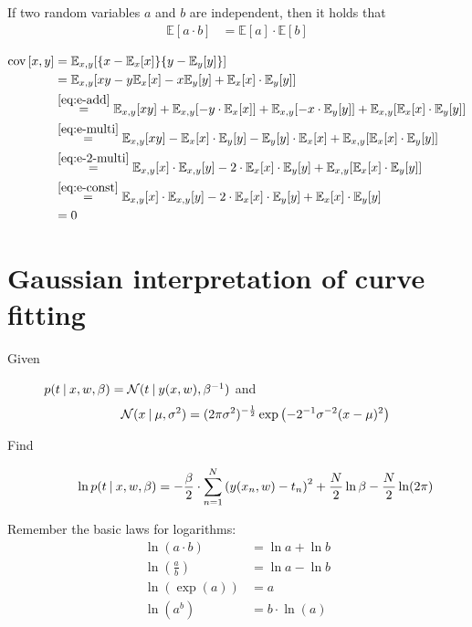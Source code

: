 \documentclass[a4paper]{article}
\newcommand\E{\mathbb{E}}
\newcommand\N{\mathcal{N}}
\DeclareMathOperator\cov{cov}
\newcommand\given{
  \nonscript\:
  \vert
  \nonscript\:
  \mathopen{}
  \allowbreak
}
\begin{document}
If two random variables $a$ and $b$ are independent, then it holds that
\begin{align}
  \E[a \cdot b] &= \E[a] \cdot \E[b]       \label{eq:e-2-multi}
\end{align}

\begin{align*}
  \cov{[x,y]}
    &= \E_{x,y}[\{x - \E_{x}[x]\}\{y - \E_{y}[y]\}] \\
    &= \E_{x,y}[xy - y\E_x[x] - x\E_y[y] + \E_x[x] \cdot \E_y[y]] \\
    &\overset{\eqref{eq:e-add}}{=} \E_{x,y}[xy] + \E_{x,y}[-y \cdot \E_x[x]] + \E_{x,y}[-x \cdot \E_y[y]] + \E_{x,y}[\E_x[x] \cdot \E_y[y]] \\
    &\overset{\eqref{eq:e-multi}}{=} \E_{x,y}[xy] - \E_x[x] \cdot \E_{y}[y] - \E_{y}[y] \cdot \E_{x}[x] + \E_{x,y}[\E_x[x] \cdot \E_y[y]] \\
    &\overset{\eqref{eq:e-2-multi}}{=} \E_{x,y}[x] \cdot \E_{x,y}[y] - 2 \cdot \E_x[x] \cdot \E_{y}[y] + \E_{x,y}[\E_x[x] \cdot \E_y[y]] \\
    &\overset{\eqref{eq:e-const}}{=} \E_{x,y}[x] \cdot \E_{x,y}[y] - 2 \cdot \E_x[x] \cdot \E_{y}[y] + \E_x[x] \cdot \E_y[y] \\
    &= 0
\end{align*}

\section{Gaussian interpretation of curve fitting}

\begin{description}
  \item[Given] $p(t \given x,w,\beta) = \N(t \given y(x,w), \beta^{-1})$ and
    \[ \N(x \given \mu, \sigma^2) = (2 \pi \sigma^2)^{-\frac12} \exp\left(-2^{-1} \sigma^{-2} (x - \mu)^2\right) \]
  \item[Find]
    \[ \ln{p(t \given x,w,\beta)} = -\frac{\beta}{2} \cdot \sum_{n=1}^N \left(y(x_n,w) - t_n\right)^2 + \frac{N}{2} \ln\beta - \frac{N}{2} \ln(2\pi) \]
\end{description}

Remember the basic laws for logarithms:
\begin{align}
  \ln(a \cdot b) &= \ln{a} + \ln{b}              \label{eq:ln-multi} \\
  \ln\left(\frac{a}{b}\right) &= \ln{a} - \ln{b} \label{eq:ln-div} \\
  \ln(\exp(a)) &= a                              \label{eq:ln-inv} \\
  \ln(a^b) &= b \cdot \ln(a)                     \label{eq:ln-power}
\end{align}
\end{document}

